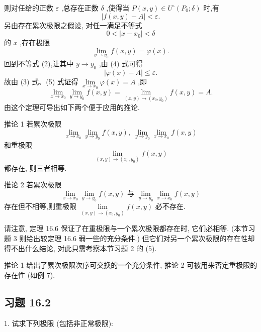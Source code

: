 则对任给的正数 \(\varepsilon\) ,总存在正数 \(\delta\) ,使得当 \(P\left( {x,y}\right)  \in  {U}^{ \circ  }\left( {{P}_{0};\delta }\right)\) 时,有
\[
\left| {f\left( {x,y}\right)  - A}\right|  < \varepsilon . \tag{2}
\]
另由存在累次极限之假设, 对任一满足不等式
\[
0 < \left| {x - {x}_{0}}\right|  < \delta  \tag{3}
\]
的 \(x\) ,存在极限
\[
\mathop{\lim }\limits_{{y \rightarrow  {y}_{0}}}f\left( {x,y}\right)  = \varphi \left( x\right) . \tag{4}
\]
回到不等式 (2),让其中 \(y \rightarrow  {y}_{0}\) ,由 (4) 式可得
\[
\left| {\varphi \left( x\right)  - A}\right|  \leq  \varepsilon . \tag{5}
\]
故由 (3) 式、(5) 式证得 \(\mathop{\lim }\limits_{{x \rightarrow  {x}_{0}}}\varphi \left( x\right)  = A\) ,即
\[
\mathop{\lim }\limits_{{x \rightarrow  {x}_{0}}}\mathop{\lim }\limits_{{y \rightarrow  {y}_{0}}}f\left( {x,y}\right)  = \mathop{\lim }\limits_{{\left( {x,y}\right)  \rightarrow  \left( {{x}_{0},{y}_{0}}\right) }}f\left( {x,y}\right)  = A.
\]
由这个定理可导出如下两个便于应用的推论.

推论 1 若累次极限
\[
\mathop{\lim }\limits_{{x \rightarrow  {x}_{0}}}\mathop{\lim }\limits_{{y \rightarrow  {y}_{0}}}f\left( {x,y}\right) ,\;\mathop{\lim }\limits_{{y \rightarrow  {y}_{0}}}\mathop{\lim }\limits_{{x \rightarrow  {x}_{0}}}f\left( {x,y}\right)
\]
和重极限
\[
\mathop{\lim }\limits_{{\left( {x,y}\right)  \rightarrow  \left( {{x}_{0},{y}_{0}}\right) }}f\left( {x,y}\right)
\]
都存在, 则三者相等.

推论 2 若累次极限
\[
\mathop{\lim }\limits_{{x \rightarrow  {x}_{0}}}\mathop{\lim }\limits_{{y \rightarrow  {y}_{0}}}f\left( {x,y}\right) \text{ 与 }\mathop{\lim }\limits_{{y \rightarrow  {y}_{0}}}\mathop{\lim }\limits_{{x \rightarrow  {x}_{0}}}f\left( {x,y}\right)
\]
存在但不相等,则重极限 \(\mathop{\lim }\limits_{{\left( {x,y}\right)  \rightarrow  \left( {{x}_{0},{y}_{0}}\right) }}f\left( {x,y}\right)\) 必不存在.

请注意, 定理 16.6 保证了在重极限与一个累次极限都存在时, 它们必相等. (本节习题 3 则给出较定理 16.6 弱一些的充分条件.) 但它们对另一个累次极限的存在性却得不出什么结论, 对此只需考察本节习题 2 的 (5).

推论 1 给出了累次极限次序可交换的一个充分条件, 推论 2 可被用来否定重极限的存在性 (如例 7).

\subsection{习题 16.2}

1. 试求下列极限 (包括非正常极限):

